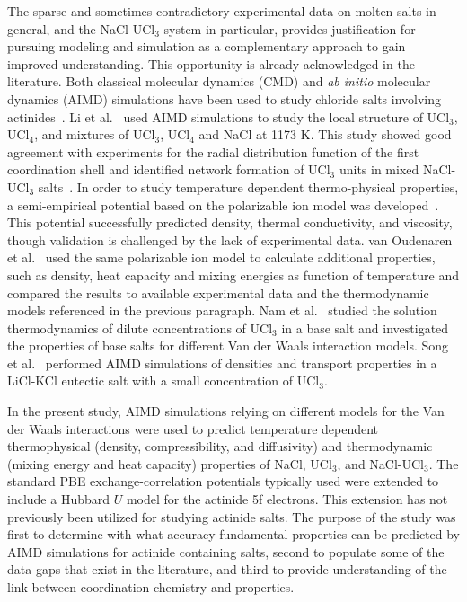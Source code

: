 \documentclass[preprint,3p,10pt,onecolumn,number,sort&compress]{elsarticle}
\begin{document}
The sparse and sometimes contradictory experimental data on molten salts in general, and the NaCl-UCl$_3$ system in particular, provides justification for pursuing modeling and simulation as a complementary approach to gain improved understanding. This opportunity is already acknowledged in the literature. Both classical molecular dynamics (CMD) and \textit{ab initio} molecular dynamics (AIMD) simulations have been used to study chloride salts involving actinides~\cite{Li,Li2020,Nam2015,SONG,VANOUDENAREN2021117470}. Li et al.~\cite{Li} used AIMD simulations to study the local structure of UCl$_3$, UCl$_4$, and mixtures of UCl$_3$, UCl$_4$ and NaCl at 1173 K. This study showed good agreement with experiments for the radial distribution function of the first coordination shell and identified network formation of UCl$_3$ units in mixed NaCl-UCl$_3$ salts~\cite{Li}. %
In order to study temperature dependent thermo-physical properties, a semi-empirical potential based on the polarizable ion model was developed~\cite{Li2020}. This potential successfully predicted density, thermal conductivity, and viscosity, though validation is challenged by the lack of experimental data. van Oudenaren et al.~\cite{VANOUDENAREN2021117470} used the same polarizable ion model to calculate additional properties, such as density, heat capacity and mixing energies as function of temperature and compared the results to available experimental data and the thermodynamic models referenced in the previous paragraph. 
Nam et al.~\cite{Nam2015} studied the solution thermodynamics of dilute concentrations of UCl$_3$ in a base salt and investigated the properties of base salts for different Van der Waals interaction models. Song et al.~\cite{SONG} performed AIMD simulations of densities and transport properties in a LiCl-KCl eutectic salt with a small concentration of UCl$_3$. 

In the present study, AIMD simulations relying on different models for the Van der Waals interactions were used to predict temperature dependent thermophysical (density, compressibility, and diffusivity) and thermodynamic (mixing energy and heat capacity) properties of NaCl, UCl$_3$, and NaCl-UCl$_3$. The standard PBE exchange-correlation potentials typically used were extended to include a Hubbard $U$ model for the actinide 5f electrons. This extension has not previously been utilized for studying actinide salts. The purpose of the study was first to determine with what accuracy fundamental properties can be predicted by AIMD simulations for actinide containing salts, second to populate some of the data gaps that exist in the literature, and third to provide understanding of the link between coordination chemistry and properties. 
\end{document}
